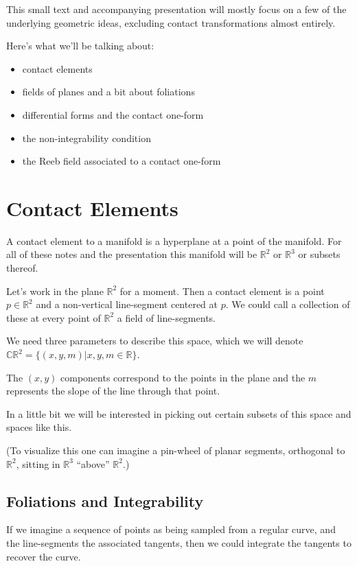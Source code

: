 \documentclass{article}
\theoremstyle{definition}
\begin{document}
This small text and accompanying presentation will mostly focus on a few of the
underlying geometric ideas, excluding contact transformations almost entirely.

Here's what we'll be talking about:

\begin{itemize}
\item contact elements
\item fields of planes and a bit about foliations
\item differential forms and the contact one-form
\item the non-integrability condition
\item the Reeb field associated to a contact one-form
\end {itemize}


\section {Contact Elements}

A contact element to a manifold is a hyperplane at a point of the manifold. For
all of these notes and the presentation this manifold will be $\mathbb{R}^{2}$
or $\mathbb{R}^{3}$ or subsets thereof.

Let's work in the plane $\mathbb{R}^{2}$ for a moment. Then a contact element is a point $p
\in \mathbb{R}^{2}$ and a non-vertical line-segment centered at $p$. We could
call a collection of these at every point of $\mathbb{R}^{2}$ a field of line-segments.

We need three parameters to describe this space, which we will denote
$\mathbb{CR}^{2} = \{ (x, y, m) | x, y, m \in \mathbb{R} \}$.

The $(x, y)$ components correspond to the points in the plane and the $m$
represents the slope of the line through that point.

In a little bit we will be interested in picking out certain subsets of this
space and spaces like this.

(To visualize this one can imagine a pin-wheel of planar segments, orthogonal to
$\mathbb{R}^{2}$, sitting in $\mathbb{R}^{3}$ ``above'' $\mathbb{R}^{2}$.)

\subsection {Foliations and Integrability}

If we imagine a sequence of points as being sampled from a regular curve, and the line-segments
the associated tangents, then we could integrate the tangents to recover the curve.
\end{document}
